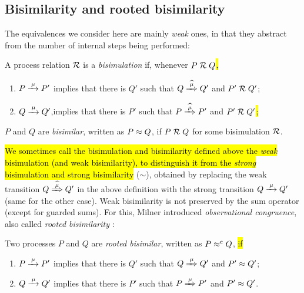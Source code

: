 \subsection{Bisimilarity and rooted bisimilarity}
\label{ss:BiEx}

The equivalences we consider here are mainly \emph{weak} ones, in that they
abstract from the number of internal steps being performed:
\begin{definition}%
\label{d:wb}
A process relation ${{\cal R}}$ is a \emph{bisimulation} if, whenever
 $P\mathrel{\cal R} Q$\hl{,} %
\begin{enumerate}
\item $P \arr\mu P'$ implies that there is $Q'$ such that $Q \Arcap \mu Q'$ and $P' \mathrel{\cal R} Q'$;
\item $Q \arr\mu Q'$,implies that there is $P'$ such that $P \Arcap
  \mu P'$ and $P' \mathrel{\cal R} Q'$\hl{;}
\end{enumerate}
 $P$ and $Q$ are \emph{bisimilar},
written as $P \approx Q$, if $P \mathrel{\cal R} Q$ for some bisimulation ${\cal R}$.
\end{definition}

\hl{We sometimes call the bisimulation and bisimilarity defined above
the \emph{weak} bisimulation (and weak bisimilarity), to
distinguish it from the \emph{strong} bisimulation and strong bisimilarity} ($\sim$),
obtained by replacing the weak transition $Q\Arcap\mu Q'$ in the above
definition with the strong transition $Q \arr \mu Q'$ (same for the
other case).
Weak bisimilarity is not preserved by the sum operator (except for
guarded sums). For this, Milner introduced \emph{observational congruence}, also called \emph{rooted
  bisimilarity} \cite{Gorrieri:2015jt,Sangiorgi:2011ut}:
\begin{definition}%
\label{d:rootedBisimilarity}
Two processes $P$ and $Q$ are \emph{rooted bisimilar}, written as $P
\mathrel{\approx^{\rm{c}}} Q$, \hl{if} %
\begin{enumerate}
 \item  $P \arr\mu P'$ implies that there is $Q'$ such that $Q
   \Arr\mu Q'$ and $P' \approx Q'$;
 \item  $Q \arr\mu Q'$ implies that there is $P'$ such that $P
   \Arr\mu P'$ and $P' \approx Q'$\enspace.
\end{enumerate}
\end{definition}

